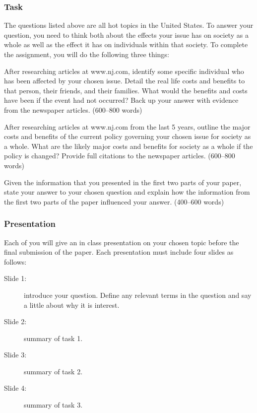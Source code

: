\documentclass[]{article}
\providecommand{\tightlist}{%
  \setlength{\itemsep}{0pt}\setlength{\parskip}{0pt}}
\begin{document}
\subsubsection{Task}\label{task}

The questions listed above are all hot topics in the United States. To
answer your question, you need to think both about the effects your
issue has on society as a whole as well as the effect it has on
individuals within that society. To complete the assignment, you will do
the following three things:

\begin{description}
\tightlist
\item[Task 1:]
After researching articles at www.nj.com, identify some specific
individual who has been affected by your chosen issue. Detail the real
life costs and benefits to that person, their friends, and their
families. What would the benefits and costs have been if the event had
not occurred? Back up your answer with evidence from the newspaper
articles. (600--800 words)
\item[Task 2:]
After researching articles at www.nj.com from the last 5 years, outline
the major costs and benefits of the current policy governing your chosen
issue for society as a whole. What are the likely major costs and
benefits for society as a whole if the policy is changed? Provide full
citations to the newspaper articles. (600--800 words)
\item[Task 3:]
Given the information that you presented in the first two parts of your
paper, state your answer to your chosen question and explain how the
information from the first two parts of the paper influenced your
answer. (400--600 words)
\end{description}

\subsubsection{Presentation}\label{presentation}

Each of you will give an in class presentation on your chosen topic
before the final submission of the paper. Each presentation must include
four slides as follows: 

\begin{description} 
\item[Slide 1:] introduce your question. Define any
relevant terms in the question and say a little about why it is
interest.
\item[Slide 2:] summary of task 1. 
\item[Slide 3:] summary of task 2. 
\item[Slide 4:] summary of task 3.
\end{description}
\end{document}
